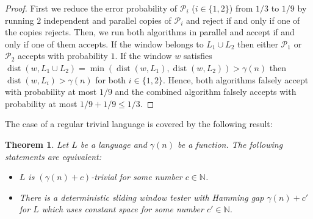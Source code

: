 \documentclass{article}\usepackage[a4paper,margin=20mm]{geometry}
\newtheorem{theorem}{Theorem}\newtheorem{lemma}[theorem]{Lemma}\newtheorem{proposition}[theorem]{Proposition}\newtheorem{corollary}[theorem]{Corollary}\newtheorem{definition}[theorem]{Definition}\newtheorem{claim}[theorem]{Claim}\newtheorem{remark}[theorem]{Remark}\newtheorem{observation}[theorem]{Observation}\newtheorem{conjecture}[theorem]{Conjecture}\newtheorem{example}[theorem]{Example}
\newcommand{\N}{\mathbb{N}}
\renewcommand{\P}{\mathcal{P}}
\DeclareMathOperator{\dist}{dist}
\renewcommand{\leq}{\leqslant}
\begin{document}
\begin{proof}
First we reduce the error probability of $\P_i$ ($i \in \{ 1,2\}$) from $1/3$ to $1/9$ 
by running $2$ independent and parallel
copies of $\P_i$ and reject if and only if one of the copies rejects. 
Then, we run both algorithms in parallel and accept if and only if one of them accepts.
If the window belongs to $L_1 \cup L_2$ then either $\P_1$ or $\P_2$ accepts with probability $1$.
If the window $w$ satisfies $\dist(w,L_1 \cup L_2)  = \min(\dist(w,L_1), \dist(w,L_2)) > \gamma(n)$
then $\dist(w,L_i) > \gamma(n)$ for both $i \in \{1,2\}$.
Hence, both algorithms falsely accept with probability at most $1/9$ and the combined 
algorithm falsely accepts with probability at most $1/9 + 1/9 \leq 1/3$.
\end{proof}
The case of a regular trivial language is covered by the following result:
\begin{theorem}
\label{prop-trivial1}
Let $L$ be a language and $\gamma(n)$ be a function. The following statements are equivalent:
\begin{itemize}
\item $L$ is $(\gamma(n)+c)$-trivial for some number $c \in \N$.
\item There is a deterministic sliding window tester
with Hamming gap $\gamma(n)+c'$ for $L$ which uses constant space for some number $c' \in \N$.
\end{itemize}
\end{theorem}
\end{document}
